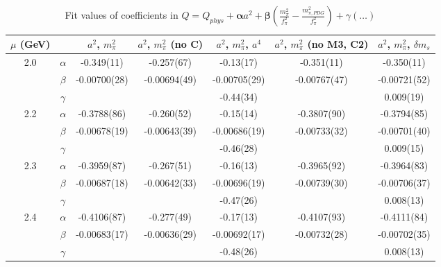 \documentclass[12pt]{extarticle}
\begin{document}
\begin{table}[h!]
\begin{center}
\begin{tabular}{|c c|c|c|c|c|c|}
\hline
$\mu$ (GeV) &  & $a^2$, $m_\pi^2$& $a^2$, $m_\pi^2$ (no C)& $a^2$, $m_\pi^2$, $a^4$& $a^2$, $m_\pi^2$ (no M3, C2)& $a^2$, $m_\pi^2$, $\delta m_s$\\
\hline
\multirow{3}{0.5in}{2.0} & $\alpha$ & -0.349(11)& -0.257(67)& -0.13(17)& -0.351(11)& -0.350(11)\\
 & $\beta$ & -0.00700(28)& -0.00694(49)& -0.00705(29)& -0.00767(47)& -0.00721(52)\\
 & $\gamma$ &  &  & -0.44(34)&  & 0.009(19)\\
\hline
\multirow{3}{0.5in}{2.2} & $\alpha$ & -0.3788(86)& -0.260(52)& -0.15(14)& -0.3807(90)& -0.3794(85)\\
 & $\beta$ & -0.00678(19)& -0.00643(39)& -0.00686(19)& -0.00733(32)& -0.00701(40)\\
 & $\gamma$ &  &  & -0.46(28)&  & 0.009(15)\\
\hline
\multirow{3}{0.5in}{2.3} & $\alpha$ & -0.3959(87)& -0.267(51)& -0.16(13)& -0.3965(92)& -0.3964(83)\\
 & $\beta$ & -0.00687(18)& -0.00642(33)& -0.00696(19)& -0.00739(30)& -0.00706(37)\\
 & $\gamma$ &  &  & -0.47(26)&  & 0.008(13)\\
\hline
\multirow{3}{0.5in}{2.4} & $\alpha$ & -0.4106(87)& -0.277(49)& -0.17(13)& -0.4107(93)& -0.4111(84)\\
 & $\beta$ & -0.00683(17)& -0.00636(29)& -0.00692(17)& -0.00732(28)& -0.00702(35)\\
 & $\gamma$ &  &  & -0.48(26)&  & 0.008(13)\\
\hline
\end{tabular}
\caption{Fit values of coefficients in $Q = Q_{phys} + \mathbf{\alpha} a^2 + \mathbf{\beta}\left(\frac{m_\pi^2}{f_\pi^2}-\frac{m_{\pi,PDG}^2}{f_\pi^2}\right) + \gamma(\ldots)$}
\end{center}
\end{table}




















\clearpage
\end{document}
